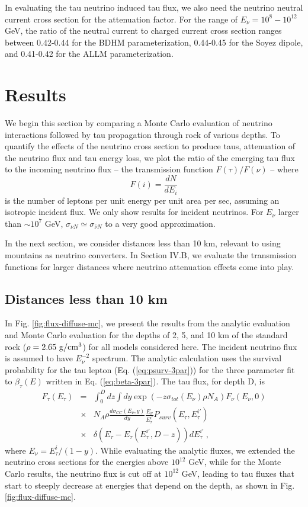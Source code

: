 \documentclass[aps,10pt,twocolumn,tightenlines]{revtex4-1}
\begin{document}
In evaluating the tau neutrino induced tau flux, we also need the neutrino neutral current cross section for the attenuation
factor. For the range of $E_\nu=10^8-10^{12}$ GeV, the ratio of the neutral current to charged current cross section ranges between 0.42-0.44 for the BDHM 
parameterization, 0.44-0.45 for the Soyez dipole, and 0.41-0.42 for the ALLM parameterization.



\section{Results}

We begin this section by comparing a Monte Carlo evaluation of neutrino interactions followed by tau propagation through rock of various depths. 
To quantify the effects of the neutrino cross section to produce taus, attenuation of the neutrino flux and tau energy loss, we plot the ratio
of the emerging tau flux to the incoming neutrino flux -- the transmission function $F(\tau)/F(\nu)$ -- where
$$F(i) = \frac{dN}{dE_i}$$
is the number of leptons per unit energy per unit area per sec, assuming an isotropic incident flux. We only show results for incident neutrinos. For $E_\nu$ larger than $\sim 10^7$ GeV,  $\sigma_{\nu N}\simeq \sigma_{\bar{\nu}N}$ to a very good
approximation. 

In the next section, we consider distances less than 10 km, relevant to using mountains as neutrino converters. In Section IV.B, we
evaluate the transmission functions for larger distances 
where neutrino attenuation effects come into play.

\subsection{Distances less than 10 km}

In Fig. \ref{fig:flux-diffuse-mc}, we present the results from the analytic evaluation and Monte Carlo evaluation
for the depths of 2, 5,  and 10 km of the standard rock ($\rho = 2.65 \ {\rm g/cm^3}$) for all models considered here.  
The incident neutrino flux is assumed to have $E_\nu^{-2}$ spectrum. The analytic calculation uses the survival probability for the tau lepton (Eq. (\ref{eq:psurv-3par})) for the three parameter fit to $\beta_\tau(E)$ written in Eq. (\ref{eq:beta-3par}). The
tau flux, for depth D, is
\begin{eqnarray}
\nonumber
F_\tau(E_\tau) &=& \int_0^D dz \int dy \exp(-z \sigma_{tot} (E_\nu) \rho N_A) F_\nu(E_\nu,0)  \\
\nonumber
& \times &  N_A \rho  \frac{d \sigma_{CC} (E_\nu,y)}{dy} \frac{E_\nu}{E_\tau^{i \prime}} P_{surv}(E_\tau,E_\tau^{i \prime}) \\
& \times &\delta(E_\tau-E_\tau(E_\tau^{i \prime},D-z) ) dE_\tau^{i \prime}\ ,
\label{eq:ftau-results}
\end{eqnarray} 
where $E_\nu = E_\tau^i/(1-y)$.
While evaluating the analytic fluxes, we extended the neutrino cross sections 
for the energies above $10^{12}$ GeV, while
for the Monte Carlo results, the neutrino flux is cut off at $10^{12}$ GeV, leading
to tau fluxes that start to steeply decrease
at energies that depend on the depth, as shown in Fig. \ref{fig:flux-diffuse-mc}. 
\end{document}
